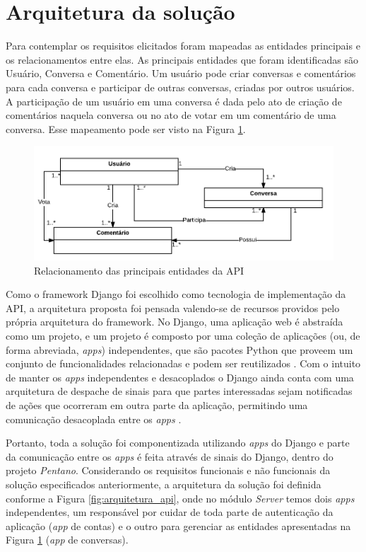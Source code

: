 \section{Arquitetura da solução}

Para contemplar os requisitos elicitados foram mapeadas as entidades principais e os relacionamentos entre elas. 
As principais entidades que foram identificadas são Usuário, Conversa e Comentário. Um usuário pode criar
conversas e comentários para cada conversa e participar de outras conversas, criadas por outros usuários.
A participação de um usuário em uma conversa é dada pelo ato de criação de comentários naquela conversa ou
no ato de votar em um comentário de uma conversa. Esse mapeamento pode ser visto na Figura \ref{fig:entidades}.

\begin{figure}[h!]
\centering
\includegraphics[scale=0.5]{figuras/entidades.png}
\caption{Relacionamento das principais entidades da API}
\label{fig:entidades}
\end{figure}

Como o framework Django foi escolhido como tecnologia de implementação da API, a arquitetura proposta foi pensada valendo-se de 
recursos providos pelo própria arquitetura do framework.
No Django, uma aplicação web é abstraída como um projeto, e um projeto é composto por uma coleção de aplicações
(ou, de forma abreviada, \textit{apps}) independentes, que
são pacotes Python que proveem um conjunto de funcionalidades relacionadas e podem ser reutilizados \cite{django_apps}.
Com o intuito de manter os \textit{apps} independentes e desacoplados o Django ainda conta com uma arquitetura de despache
de sinais para que partes interessadas sejam notificadas de ações que ocorreram em outra parte da aplicação, permitindo uma comunicação
desacoplada entre os \textit{apps} \cite{django_signals}.

Portanto, toda a solução foi componentizada utilizando \textit{apps} do 
Django e parte da comunicação entre os \textit{apps} é feita através de sinais do Django, dentro do projeto \emph{Pentano}.
Considerando os requisitos funcionais e não funcionais da solução especificados anteriormente, a arquitetura da solução foi definida 
conforme a Figura \ref{fig:arquitetura_api}, onde no módulo \textit{Server} temos dois \textit{apps} independentes, um responsável
por cuidar de toda parte de autenticação da aplicação (\textit{app} de contas) e o outro para gerenciar as entidades apresentadas na
Figura \ref{fig:entidades} (\textit{app} de conversas).

